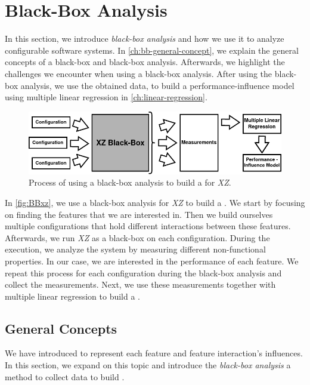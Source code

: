 \section{Black-Box Analysis}\label{ch:Blackbox}
In this section, we introduce \emph{black-box analysis} and how we use it to analyze configurable software systems. 
In \autoref{ch:bb-general-concept}, we explain the general concepts of a black-box and black-box analysis. 
Afterwards, we highlight the challenges we encounter when using a black-box analysis.
After using the black-box analysis, we use the obtained data, to build a performance-influence model using multiple linear regression in \autoref{ch:linear-regression}.

\begin{figure}[h]
    \centering
    \includegraphics[scale=0.53]{gfx/BlackBox2_0.png}
    \caption{Process of using a black-box analysis to build a {\perfInfluenceModel} for \textit{XZ}.}
    \label{fig:BBxz}
\end{figure}

In \autoref{fig:BBxz}, we use a black-box analysis for \textit{XZ} to build a \perfInfluenceModel.
We start by focusing on finding the features that we are interested in. 
Then we build ourselves multiple configurations that hold different interactions between these features.
Afterwards, we run \textit{XZ} as a black-box on each configuration. During the execution, we analyze the system by measuring different non-functional properties.
In our case, we are interested in the performance of each feature. 
We repeat this process for each configuration during the black-box analysis and collect the measurements.
Next, we use these measurements together with multiple linear regression to build a \perfInfluenceModel.

\subsection{General Concepts}\label{ch:bb-general-concept}

We have introduced {\perfInfluenceModel} to represent each feature and feature interaction's influences. 
In this section, we expand on this topic and introduce the \emph{black-box analysis} a method to collect data to build \perfInfluenceModel.

